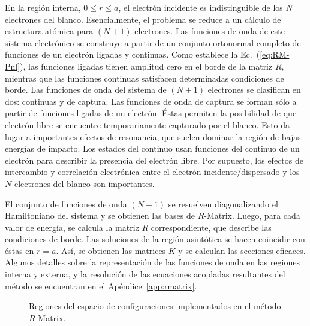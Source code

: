 En la región interna, $0\leq r\leq a$, el electrón incidente es 
indistinguible de los $N$ electrones del blanco. Esencialmente, el 
problema se reduce a un cálculo de estructura atómica para $(N+1)$ 
electrones. Las funciones de onda de este sistema electrónico se 
construye a partir de un conjunto ortonormal completo de funciones de un 
electrón ligadas y continuas. Como establece la Ec.~(\ref{eq:RM-Pnl}), 
las funciones ligadas tienen amplitud cero en el borde de la matriz $R$, 
mientras que las funciones continuas satisfacen determinadas condiciones 
de borde. Las funciones de onda del sistema de $(N+1)$ electrones se 
clasifican en dos: continuas y de captura. Las funciones de onda de 
captura se forman sólo a partir de funciones ligadas de un electrón. 
Éstas permiten la posibilidad de que electrón libre se encuentre 
temporariamente capturado por el blanco. Esto da lugar a importantes 
efectos de resonancia, que suelen dominar la región de bajas energías de 
impacto. Los estados del continuo usan funciones del continuo de un 
electrón para describir la presencia del electrón libre. Por supuesto, 
los efectos de intercambio y correlación electrónica entre el electrón 
incidente/dispersado y los $N$ electrones del blanco son importantes. 

El conjunto de funciones de onda $(N+1)$ se resuelven diagonalizando el
Hamiltoniano del sistema y se obtienen las bases de $R$-Matrix.
Luego, para cada valor de energía, se calcula la matriz $R$ 
correspondiente, que describe las condiciones de borde. Las soluciones 
de la región asintótica se hacen coincidir con éstas en $r=a$. Así, se 
obtienen las matrices $K$ y se calculan las secciones eficaces. Algunos 
detalles sobre la representación de las funciones de onda en las 
regiones interna y externa, y la resolución de las ecuaciones acopladas 
resultantes del método se encuentran en el Apéndice~\ref{app:rmatrix}.

\begin{figure}
\centering
{}
\vspace{0.5cm}
\caption{Regiones del espacio de configuraciones implementados en el 
método $R$-Matrix.}
\label{fig:rmatrix-regions}
\end{figure}

